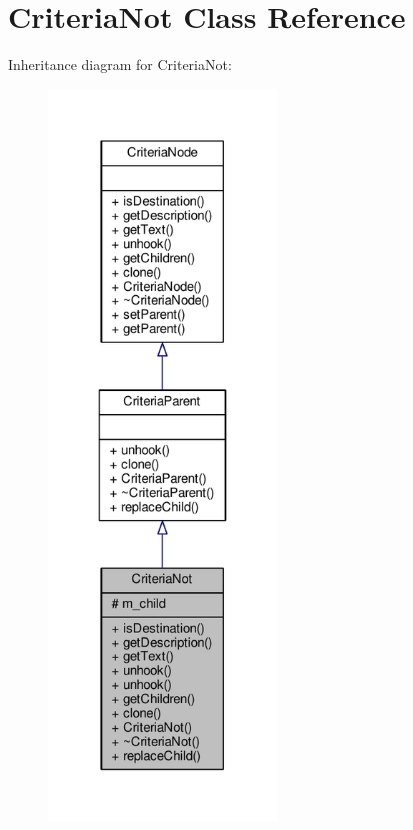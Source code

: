 \hypertarget{classCriteriaNot}{}\section{Criteria\+Not Class Reference}
\label{classCriteriaNot}


Inheritance diagram for Criteria\+Not\+:
\nopagebreak
\begin{figure}[H]
\begin{center}
\leavevmode
\includegraphics[height=550pt]{db/d76/classCriteriaNot__inherit__graph}
\end{center}
\end{figure}


